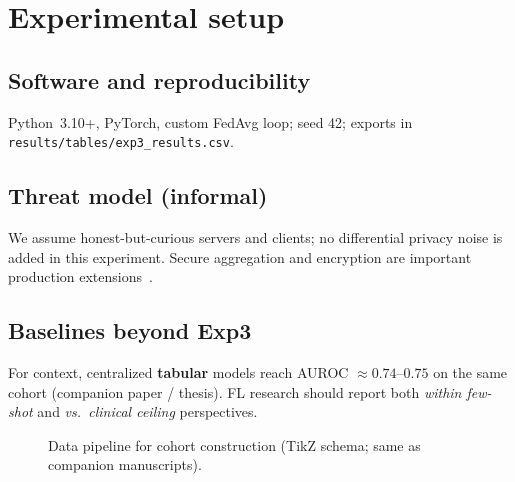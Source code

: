 \section{Experimental setup}
\label{sec:exp}

\subsection{Software and reproducibility}
Python~3.10+, PyTorch, custom FedAvg loop; seed 42; exports in \texttt{results/tables/exp3\_results.csv}.

\subsection{Threat model (informal)}
We assume honest-but-curious servers and clients; no differential privacy noise is added in this experiment. Secure aggregation and encryption are important production extensions~\citep{kairouz2021advances}.

\subsection{Baselines beyond Exp3}
For context, centralized \textbf{tabular} models reach AUROC $\approx 0.74$--$0.75$ on the same cohort (companion paper / thesis). FL research should report both \emph{within few-shot} and \emph{vs.\ clinical ceiling} perspectives.

\begin{figure}[htbp]
  \centering
  \resizebox{0.92\textwidth}{!}{}
  \caption{Data pipeline for cohort construction (TikZ schema; same as companion manuscripts).}
  \label{fig:schema_b}
\end{figure}
